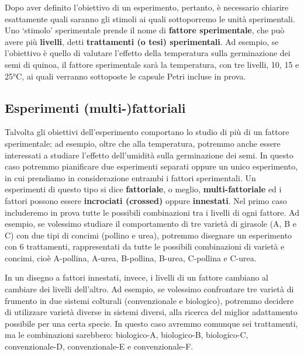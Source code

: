 \documentclass[a4paper,12pt,oneside]{book}
\begin{document}
Dopo aver definito l'obiettivo di un esperimento, pertanto, è necessario chiarire esattamente quali saranno gli stimoli ai quali sottoporremo le unità sperimentali. Uno `stimolo' sperimentale prende il nome di \textbf{fattore sperimentale}, che può avere più \textbf{livelli}, detti \textbf{trattamenti (o tesi) sperimentali}. Ad esempio, se l'obiettivo è quello di valutare l'effetto della temperatura sulla germinazione dei semi di quinoa, il fattore sperimentale sarà la temperatura, con tre livelli, 10, 15 e 25°C, ai quali verranno sottoposte le capsule Petri incluse in prova.

\hypertarget{esperimenti-multi-fattoriali}{%
\subsection{Esperimenti (multi-)fattoriali}\label{esperimenti-multi-fattoriali}}

Talvolta gli obiettivi dell'esperimento comportano lo studio di più di un fattore sperimentale; ad esempio, oltre che alla temperatura, potremmo anche essere interessati a studiare l'effetto dell'umidità sulla germinazione dei semi. In questo caso potremmo pianificare due esperimenti separati oppure un unico esperimento, in cui prendiamo in considerazione entrambi i fattori sperimentali. Un esperimenti di questo tipo si dice \textbf{fattoriale}, o meglio, \textbf{multi-fattoriale} ed i fattori possono essere \textbf{incrociati (crossed)} oppure \textbf{innestati}. Nel primo caso includeremo in prova tutte le possibili combinazioni tra i livelli di ogni fattore. Ad esempio, se volessimo studiare il comportamento di tre varietà di girasole (A, B e C) con due tipi di concimi (pollino e urea), potremmo disegnare un esperimento con 6 trattamenti, rappresentati da tutte le possibili combinazioni di varietà e concimi, cioè A-pollina, A-urea, B-pollina, B-urea, C-pollina e C-urea.

In un disegno a fattori innestati, invece, i livelli di un fattore cambiano al cambiare dei livelli dell'altro. Ad esempio, se volessimo confrontare tre varietà di frumento in due sistemi colturali (convenzionale e biologico), potremmo decidere di utilizzare varietà diverse in sistemi diversi, alla ricerca del miglior adattamento possibile per una certa specie. In questo caso avremmo comunque sei trattamenti, ma le combinazioni sarebbero: biologico-A, biologico-B, biologico-C, convenzionale-D, convenzionale-E e convenzionale-F.
\end{document}
